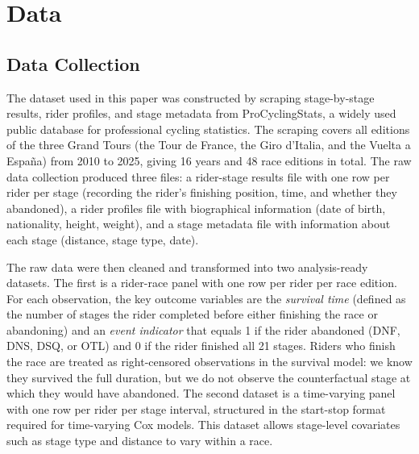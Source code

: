 
\section{Data}
\label{sec:data}

\subsection{Data Collection}

The dataset used in this paper was constructed by scraping stage-by-stage results, rider profiles, and stage metadata from ProCyclingStats, a widely used public database for professional cycling statistics. The scraping covers all editions of the three Grand Tours (the Tour de France, the Giro d'Italia, and the Vuelta a Espa\~{n}a) from 2010 to 2025, giving 16 years and 48 race editions in total. The raw data collection produced three files: a rider-stage results file with one row per rider per stage (recording the rider's finishing position, time, and whether they abandoned), a rider profiles file with biographical information (date of birth, nationality, height, weight), and a stage metadata file with information about each stage (distance, stage type, date).

The raw data were then cleaned and transformed into two analysis-ready datasets. The first is a rider-race panel with one row per rider per race edition. For each observation, the key outcome variables are the \emph{survival time} (defined as the number of stages the rider completed before either finishing the race or abandoning) and an \emph{event indicator} that equals 1 if the rider abandoned (DNF, DNS, DSQ, or OTL) and 0 if the rider finished all 21 stages. Riders who finish the race are treated as right-censored observations in the survival model: we know they survived the full duration, but we do not observe the counterfactual stage at which they would have abandoned. The second dataset is a time-varying panel with one row per rider per stage interval, structured in the start-stop format required for time-varying Cox models. This dataset allows stage-level covariates such as stage type and distance to vary within a race.

